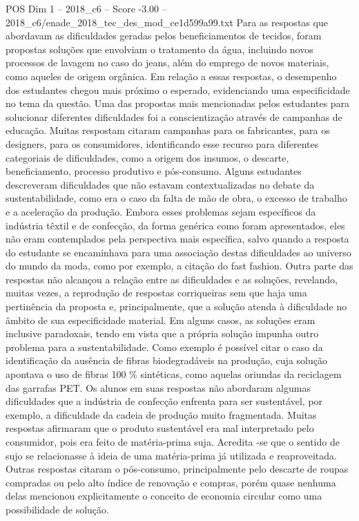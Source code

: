 \begin{textsample}{POS Dim 1 – 2018\_c6 – Score -3.00 – 2018\_c6/enade\_2018\_tec\_des\_mod\_ce1d599a99.txt}
Para as respostas que abordavam as dificuldades geradas pelos beneficiamentos de tecidos, foram propostas soluções que envolviam o tratamento da água, incluindo novos processos de lavagem no caso do jeans, além do emprego de novos materiais, como aqueles de origem orgânica.
Em relação a essas respostas, o desempenho dos estudantes chegou mais próximo o esperado, evidenciando uma especificidade no tema da questão.
Uma das propostas mais mencionadas pelos estudantes para solucionar diferentes dificuldades foi a conscientização através de campanhas de educação.
Muitas respostam citaram campanhas para os fabricantes, para os designers, para os consumidores, identificando esse recurso para diferentes categoriais de dificuldades, como a origem dos insumos, o descarte, beneficiamento, processo produtivo e pós-consumo.
Alguns estudantes descreveram dificuldades que não estavam contextualizadas no debate da sustentabilidade, como era o caso da falta de mão de obra, o excesso de trabalho e a aceleração da produção.
Embora esses problemas sejam específicos da indústria têxtil e de confecção, da forma genérica como foram apresentados, eles não eram contemplados pela perspectiva mais específica, salvo quando a resposta do estudante se encaminhava para uma associação destas dificuldades ao universo do mundo da moda, como por exemplo, a citação do fast fashion.
Outra parte das respostas não alcançou a relação entre as dificuldades e as soluções, revelando, muitas vezes, a reprodução de respostas corriqueiras sem que haja uma pertinência da proposta e, principalmente, que a solução atenda à dificuldade no âmbito de sua especificidade material.
Em alguns casos, as soluções eram inclusive paradoxais, tendo em vista que a própria solução impunha outro problema para a sustentabilidade.
Como exemplo é possível citar o caso da identificação da ausência de fibras biodegradáveis na produção, cuja solução apontava o uso de fibras 100 \% sintéticas, como aquelas oriundas da reciclagem das garrafas PET.
Os alunos em suas respostas não abordaram algumas dificuldades que a indústria de confecção enfrenta para ser sustentável, por exemplo, a dificuldade da cadeia de produção muito fragmentada.
Muitas respostas afirmaram que o produto sustentável era mal interpretado pelo consumidor, pois era feito de matéria-prima suja.
Acredita -se que o sentido de sujo se relacionasse à ideia de uma matéria-prima já utilizada e reaproveitada.
Outras respostas citaram o pós-consumo, principalmente pelo descarte de roupas compradas ou pelo alto índice de renovação e compras, porém quase nenhuma delas mencionou explicitamente o conceito de economia circular como uma possibilidade de solução.

\end{textsample}
